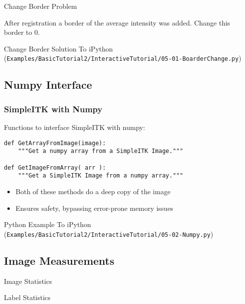\begin{frame}{Change Border Problem}

After registration a border of the average intensity was added. Change this border to 0.

\end{frame}

\begin{frame}{Change Border Solution}
To iPython (\texttt{Examples/BasicTutorial2/InteractiveTutorial/05-01-BoarderChange.py})
\end{frame}

\subsection{Numpy Interface}
\begin{frame}[fragile]
\frametitle{SimpleITK with Numpy}

Functions to interface SimpleITK with numpy:

\lstpython
\begin{lstlisting}
def GetArrayFromImage(image):
    """Get a numpy array from a SimpleITK Image."""

def GetImageFromArray( arr ):
    """Get a SimpleITK Image from a numpy array."""
\end{lstlisting}
\begin{itemize}
  \item Both of these methods do a deep copy of the image
  \item Ensures safety, bypassing error-prone memory issues
\end{itemize}

\end{frame}

\begin{frame}{Python Example}
To iPython (\texttt{Examples/BasicTutorial2/InteractiveTutorial/05-02-Numpy.py})
\end{frame}

%
%

\subsection{Image Measurements}
\begin{frame}{Image Statistics}
\end{frame}

\begin{frame}{Label Statistics}
\end{frame}


